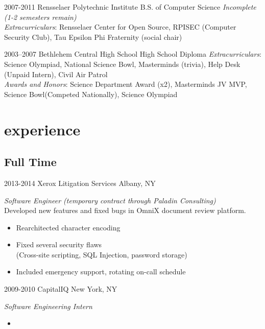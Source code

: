 \documentclass[]{friggeri-cv} %
\begin{document}
\begin{entrylist}


\entry
{2007-2011}
{Rensselaer Polytechnic Institute}
{B.S. of Computer Science}
{\emph{Incomplete (1-2 semesters remain)}
\\ \emph{Extracurriculars}: Rensselaer Center for Open Source, RPISEC (Computer Security Club), Tau Epsilon Phi Fraternity (social chair) }


\entry
{2003--2007}
{Bethlehem Central High School}
{High School Diploma}
{\emph{Extracurriculars}: Science Olympiad, National Science Bowl, Masterminds (trivia), Help Desk (Unpaid Intern), Civil Air Patrol
\\ \emph{Awards and Honors}: Science Department Award (x2), Masterminds JV MVP, Science Bowl(Competed Nationally), Science Olympiad}


\end{entrylist}


\section{experience}

\subsection{Full Time}

\begin{entrylist}


\entry
{2013-2014}
{Xerox Litigation Services}
{Albany, NY}
{\emph{Software Engineer (temporary contract through Paladin Consulting)} \\
Developed new features and fixed bugs in OmniX document review platform.
\begin{itemize}
\item Rearchitected character encoding
\item Fixed several security flaws \\
(Cross-site scripting, SQL Injection, password storage)
\item Included emergency support, rotating on-call schedule
\end{itemize}
}

\entry
{2009-2010}
{CapitalIQ}
{New York, NY}
{
\emph{Software Engineering Intern}
\begin{itemize}
\item 
\end{itemize}
}

\entry
{}
{}
{}
{}

\end{entrylist}
\end{document}
